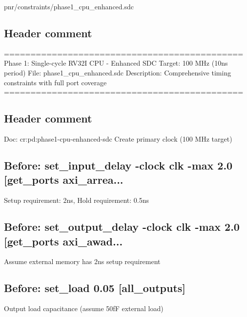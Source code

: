 \begin{relocated}{pnr/constraints/phase1_cpu_enhanced.sdc}

\subsection*{Header comment}

\begin{textblock}
=============================================
Phase 1: Single-cycle RV32I CPU - Enhanced SDC
Target: 100 MHz (10ns period)
File: phase1_cpu_enhanced.sdc
Description: Comprehensive timing constraints with full port coverage
=============================================
\end{textblock}

\subsection*{Header comment}

\begin{textblock}
Doc: cr:pd:phase1-cpu-enhanced-sdc
Create primary clock (100 MHz target)
\end{textblock}

\subsection*{Before: set\_input\_delay -clock clk -max 2.0 [get\_ports axi\_arrea...}

\begin{textblock}
Setup requirement: 2ns, Hold requirement: 0.5ns
\end{textblock}

\subsection*{Before: set\_output\_delay -clock clk -max 2.0 [get\_ports axi\_awad...}

\begin{textblock}
Assume external memory has 2ns setup requirement
\end{textblock}

\subsection*{Before: set\_load 0.05 [all\_outputs]}

\begin{textblock}
Output load capacitance (assume 50fF external load)
\end{textblock}

\end{relocated}

